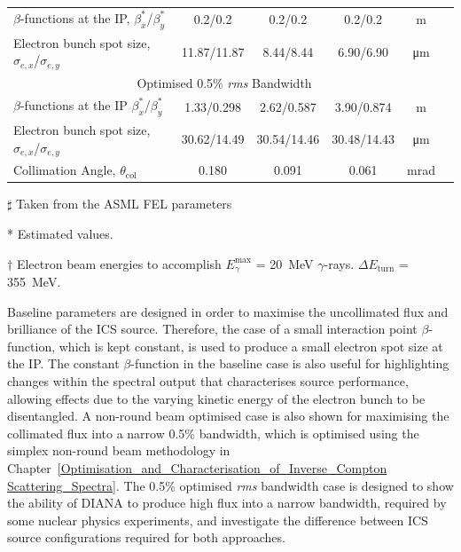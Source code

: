 \documentclass[../main.tex]{subfiles}
\begin{document}
\begin{table}[!h]
\begin{threeparttable}
\begin{tabular}{lccccc}
\hline
$\beta$-functions at the IP, $\beta_{x}^{*}$/$\beta_{y}^{*}$ & 0.2/0.2 & 0.2/0.2 & 0.2/0.2 & \si{\meter} \\
Electron bunch spot size, $\sigma_{e,x}$/$\sigma_{e,y}$ & 11.87/11.87 & 8.44/8.44 & 6.90/6.90 & \si{\micro\meter}\\
\hline\multicolumn{5}{c}{Optimised 0.5\% \textit{rms} Bandwidth} \\
\hline
$\beta$-functions at the IP $\beta_{x}^{*}$/$\beta_{y}^{*}$ & 1.33/0.298 & 2.62/0.587 & 3.90/0.874 & \si{\meter} \\
Electron bunch spot size, $\sigma_{e,x}$/$\sigma_{e,y}$ & 30.62/14.49 & 30.54/14.46 & 30.48/14.43 & \si{\micro\meter}\\
Collimation Angle, $\theta_{\mathrm{col}}$ & 0.180 & 0.091 & 0.061 & \si{\milli\radian} \\ 
\hline\hline
\end{tabular}
\begin{tablenotes}
\item[$\sharp$]{Taken from the ASML FEL parameters \cite{akkermans2017compact}}
\item[*]{Estimated values.}
\item[$\dagger$]{Electron beam energies to accomplish $E_{\gamma}^{\mathrm{max}}$ = 20~\si{\mega\electronvolt} $\gamma$-rays. $\Delta E_{\mathrm{turn}}$ = 355~\si{\mega\electronvolt}.}
\end{tablenotes}
\end{threeparttable}
\label{tab:DIANA_electron_beam_design_parameters}
\end{table}

Baseline parameters are designed in order to maximise the uncollimated flux and brilliance of the ICS source. Therefore, the case of a small interaction point $\beta$-function, which is kept constant, is used to produce a small electron spot size at the IP. The constant $\beta$-function in the baseline case is also useful for highlighting changes within the spectral output that characterises source performance, allowing effects due to the varying kinetic energy of the electron bunch to be disentangled. A non-round beam optimised case is also shown for maximising the collimated flux into a narrow 0.5\% bandwidth, which is optimised using the simplex non-round beam methodology in Chapter~\ref{Optimisation_and_Characterisation_of_Inverse_Compton Scattering_Spectra}. The 0.5\% optimised \textit{rms} bandwidth case is designed to show the ability of DIANA to produce high flux into a narrow bandwidth, required by some nuclear physics experiments, and investigate the difference between ICS source configurations required for both approaches. 
\end{document}

